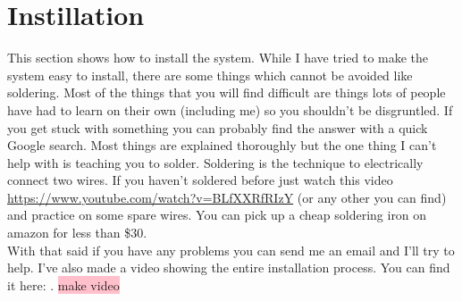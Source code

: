 \documentclass[12pt]{article}
\begin{document}
\section{Instillation}
This section shows how to install the system.  While I have tried to make the system easy to install, there are some things which cannot be avoided like soldering.  Most of the things that you will find difficult are things lots of people have had to learn on their own (including me) so you shouldn't be disgruntled.  If you get stuck with something you can probably find the answer with a quick Google search.  Most things are explained thoroughly but the one thing I can't help with is teaching you to solder.  Soldering is the technique to electrically connect two wires.  If you haven't soldered before just watch this video \url{https://www.youtube.com/watch?v=BLfXXRfRIzY} (or any other you can find) and  practice on some spare wires.  You can pick up a cheap soldering iron on amazon for less than \$30.\\
With that said if you have any problems you can send me an email and I'll try to help.  I've also made a video showing the entire installation process.  You can find it here: \url{}. \colorbox{pink}{make video}\\
\end{document}
